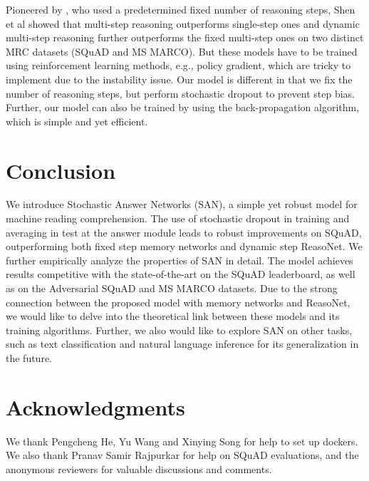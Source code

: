 \documentclass[11pt,a4paper]{article}
\begin{document}
Pioneered by \cite{hill2015goldilocks,dhingra2016gated,sordoni2016iterative,kumar15askme}, who used a predetermined fixed number of reasoning steps, Shen et al  showed that multi-step reasoning outperforms single-step ones and dynamic multi-step reasoning further outperforms the fixed multi-step ones on two distinct MRC datasets (SQuAD and MS MARCO). But these models have to be trained using reinforcement learning methods, e.g., policy gradient, which are tricky to implement due to the instability issue.
Our model is different in that we fix the number of reasoning steps, but perform stochastic dropout to prevent step bias. Further, our model can also be trained by using the back-propagation algorithm, which is simple and yet efficient.

\section{Conclusion}
We introduce Stochastic Answer Networks (SAN), a simple yet robust model for machine reading comprehension. The use of stochastic dropout in training and averaging in test at the answer module leads to robust improvements on SQuAD, outperforming both fixed step memory networks and dynamic step ReasoNet. We further empirically analyze the properties of SAN in detail.
The model achieves results competitive with the state-of-the-art on the SQuAD leaderboard, as well as on the Adversarial SQuAD and MS MARCO datasets.
Due to the strong connection between the proposed model with memory networks and ReasoNet, we would like to delve into the theoretical link between these models and its training algorithms. Further, we also would like to explore SAN on other tasks, such as text classification and natural language inference for its generalization in the future.

\section*{Acknowledgments}
We thank Pengcheng He, Yu Wang and Xinying Song for help to set up dockers. We also thank Pranav Samir Rajpurkar for help on SQuAD evaluations, and the anonymous reviewers for valuable discussions
and comments.


\end{document}
